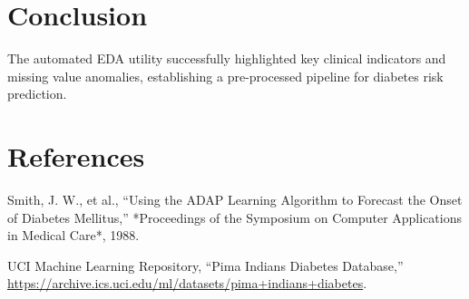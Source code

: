 \documentclass[12pt,a4paper]{article}
\begin{document}
\section{Conclusion}
The automated EDA utility successfully highlighted key clinical indicators and missing value anomalies, establishing a pre-processed pipeline for diabetes risk prediction.

\section{References}
\begin{enumerate}[label={[\arabic*]}, leftmargin=2em]
    \item Smith, J. W., et al., ``Using the ADAP Learning Algorithm to Forecast the Onset of Diabetes Mellitus,'' *Proceedings of the Symposium on Computer Applications in Medical Care*, 1988.
    \item UCI Machine Learning Repository, ``Pima Indians Diabetes Database,'' \url{https://archive.ics.uci.edu/ml/datasets/pima+indians+diabetes}.
\end{enumerate}
\end{document}
